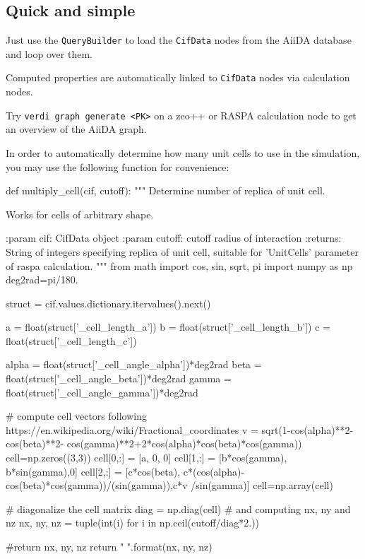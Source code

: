 \documentclass[twoside,a4paper,11pt]{extarticle}
\begin{document}
\subsection{Quick and simple}

Just use the \verb|QueryBuilder| to load the \verb|CifData| 
nodes from the AiiDA database and loop over them.

Computed properties are automatically linked to \verb|CifData| nodes via calculation nodes.

Try \verb|verdi graph generate <PK>| on a zeo++ or RASPA calculation node to get an overview of the AiiDA graph.

In order to automatically determine how many unit cells to use in the simulation,
you may use the following function for convenience:
\begin{pythoncommand}
def multiply_cell(cif, cutoff):
    """ Determine number of replica of unit cell.
    
    Works for cells of arbitrary shape.
    
    :param cif:  CifData object
    :param cutoff:  cutoff radius of interaction   
    :returns:  String of integers specifying replica of unit cell, 
               suitable for 'UnitCells' parameter of raspa calculation.
    """
    from math import cos, sin, sqrt, pi
    import numpy as np
    deg2rad=pi/180.

    struct = cif.values.dictionary.itervalues().next()

    a = float(struct['_cell_length_a'])
    b = float(struct['_cell_length_b'])
    c = float(struct['_cell_length_c'])

    alpha = float(struct['_cell_angle_alpha'])*deg2rad
    beta  = float(struct['_cell_angle_beta'])*deg2rad
    gamma = float(struct['_cell_angle_gamma'])*deg2rad

    # compute cell vectors following https://en.wikipedia.org/wiki/Fractional_coordinates
    v = sqrt(1-cos(alpha)**2-cos(beta)**2-
             cos(gamma)**2+2*cos(alpha)*cos(beta)*cos(gamma))
    cell=np.zeros((3,3))
    cell[0,:] = [a, 0, 0]
    cell[1,:] = [b*cos(gamma), b*sin(gamma),0]
    cell[2,:] = [c*cos(beta), c*(cos(alpha)-cos(beta)*cos(gamma))/(sin(gamma)),c*v
               /sin(gamma)]
    cell=np.array(cell)

    # diagonalize the cell matrix
    diag = np.diag(cell)
    # and computing nx, ny and nz
    nx, ny, nz = tuple(int(i) for i in np.ceil(cutoff/diag*2.))
    
    #return nx, ny, nz
    return "{} {} {}".format(nx, ny, nz)
\end{pythoncommand}
\end{document}
